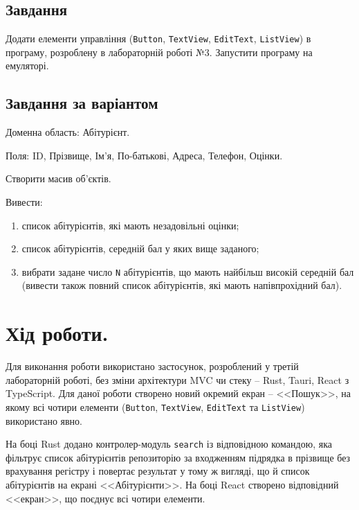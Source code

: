\documentclass[14pt, a4paper]{extreport}
\begin{document}
	\subsection*{Завдання}
	
	Додати елементи управління (\texttt{Button}, \texttt{TextView}, \texttt{EditText}, \texttt{ListView}) в програму, розроблену в лабораторній роботі №3. Запустити програму на емуляторі.
	
	\subsection*{Завдання за варіантом}
	
	Доменна область: Абітурієнт. 
	
	Поля:  ID, Прізвище, Ім'я, По-батькові, Адреса, Телефон, Оцінки. 
	
	Створити масив об'єктів. 
	
	Вивести:
	
	\begin{enumerate}[label=\alph*.]
		\item список абітурієнтів, які мають незадовільні оцінки;
		
		\item список абітурієнтів, середній бал у яких вище заданого;
		
		\item вибрати задане число \texttt{N} абітурієнтів, що мають найбільш високій середній бал (вивести також повний список абітурієнтів, які мають напівпрохідний бал).
	\end{enumerate}
	
	\section*{Хід роботи.}

	Для виконання роботи використано застосунок, розроблений у третій лабораторній роботі, без зміни архітектури MVC чи стеку -- Rust, Tauri, React з TypeScript. Для даної роботи створено новий окремий екран -- <<Пошук>>, на якому всі чотири елементи (\texttt{Button}, \texttt{TextView}, \texttt{EditText} та \texttt{ListView}) використано явно.
	
	
	На боці Rust додано контролер-модуль \texttt{search} із відповідною командою, яка фільтрує список абітурієнтів репозиторію за входженням підрядка в прізвище без врахування регістру і повертає результат у тому ж вигляді, що й список абітурієнтів на екрані <<Абітурієнти>>. На боці React створено відповідний <<екран>>, що поєднує всі чотири елементи.
	
\end{document}
